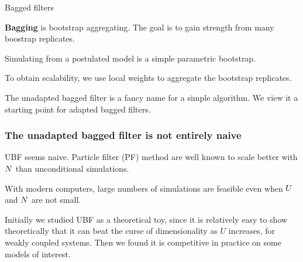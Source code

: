 \documentclass{beamer}
\begin{document}
\begin{frame}{Bagged filters}

  \begin{myitemize}

  \item {\bf Bagging} is bootstrap aggregating. The goal is to gain strength from many boostrap replicates.

    \BFsep
    
  \item Simulating from a postulated model is a simple parametric bootstrap.

    \BFsep
    
  \item To obtain scalability, we use local weights to aggregate the bootstrap replicates.

    \BFsep
    
    \item The unadapted bagged filter is a fancy name for a simple algorithm.  We view it a starting point for adapted bagged filters.

      \end{myitemize}
  
\end{frame}

\begin{frame}

  \frametitle{The unadapted bagged filter is not entirely naive}

  \begin{myitemize}

  \item UBF seems naive. Particle filter (PF) method are well known to scale better with $N$ than unconditional simulations.

    \vspace{5mm}
    
  \item With modern computers, large numbers of simulations are feasible even when $U$ and $N$ are not small.

      \vspace{5mm}

    \item Initially we studied UBF as a theoretical toy, since it is relatively easy to show theoretically that it can beat the curse of dimensionality as $U$ increases, for weakly coupled systems. Then we found it is competitive in practice on some models of interest.
  \end{myitemize}

\end{frame}
\end{document}
